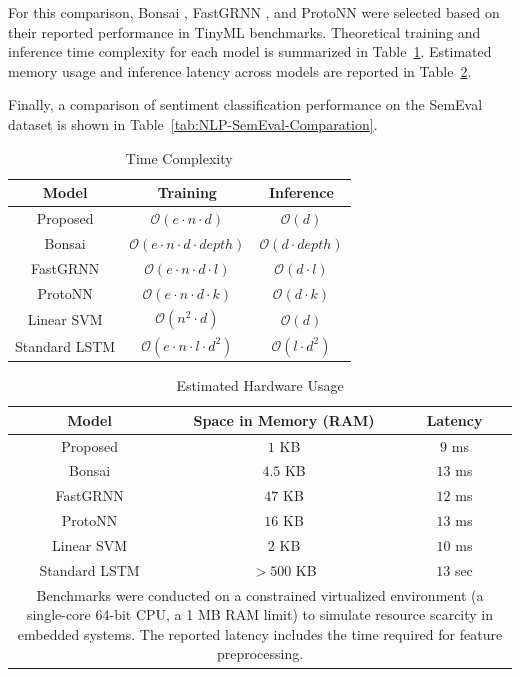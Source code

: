\documentclass[conference]{IEEEtran}
\begin{document}
For this comparison, Bonsai \cite{b11}, FastGRNN \cite{b12}, and ProtoNN \cite{b11} were selected based on their reported performance in TinyML benchmarks. Theoretical training and inference time complexity for each model is summarized in Table~\ref{tab:Time-Complexity-Comparation}. Estimated memory usage and inference latency across models are reported in Table~\ref{tab:Estimated-Hardware-Usage-Comparation}.

Finally, a comparison of sentiment classification performance on the SemEval dataset is shown in Table~\ref{tab:NLP-SemEval-Comparation}.

\begin{table}[H]
    \centering
    \caption{Time Complexity}
    \label{tab:Time-Complexity-Comparation}
    \begin{tabular}{c c c}
        \hline
        Model & Training & Inference\\
        \hline
        Proposed & $\mathcal{O}(e \cdot n \cdot d)$ & $\mathcal{O}(d)$\\
        Bonsai & $\mathcal{O}(e \cdot n \cdot d  \cdot depth)$ & $\mathcal{O}(d \cdot depth)$\\
        FastGRNN & $\mathcal{O}(e \cdot n \cdot d \cdot l)$ & $\mathcal{O}(d \cdot l)$\\
        ProtoNN & $\mathcal{O}(e \cdot n \cdot d \cdot k)$ & $\mathcal{O}(d \cdot k)$\\
        Linear SVM & $\mathcal{O}(n^2 \cdot d)$ & $\mathcal{O}(d)$\\
        Standard LSTM & $\mathcal{O}(e \cdot n \cdot l \cdot d^2)$ & $\mathcal{O}(l \cdot d^2)$\\
        \hline
    \end{tabular}
\end{table}

\begin{table}[H]
    \centering
    \caption{Estimated Hardware Usage}
    \label{tab:Estimated-Hardware-Usage-Comparation}
    \begin{tabular}{c c c}
        \hline
        Model & Space in Memory (RAM) & Latency\\
        \hline
        Proposed & $1$ KB & $9$ ms\\
        Bonsai & $4.5$ KB & $13$ ms\\
        FastGRNN & $47$ KB & $12$ ms\\
        ProtoNN & $16$ KB & $13$ ms\\
        Linear SVM & $2$ KB & $10$ ms\\
        Standard LSTM & $>500$ KB & $13$ sec\\
        \hline
        \multicolumn{3}{p{0.9\linewidth}}{\centering
        Benchmarks were conducted on a constrained virtualized environment (a single-core 64-bit CPU, a 1 MB RAM limit) to simulate resource scarcity in embedded systems. The reported latency includes the time required for feature preprocessing.
        }
    \end{tabular}
\end{table}
\end{document}
